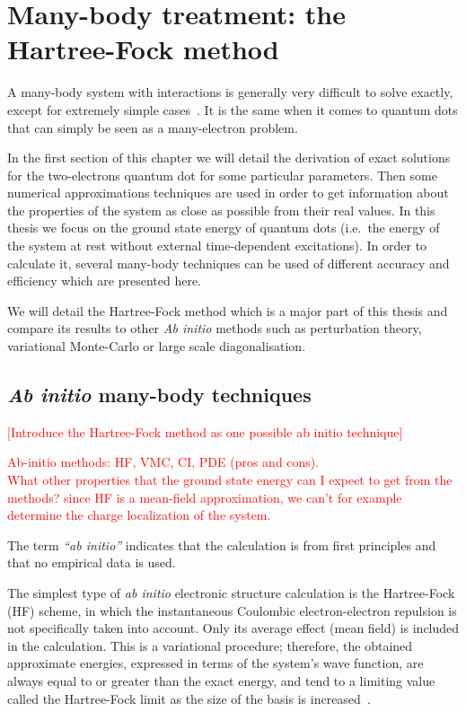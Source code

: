 \chapter{Many-body treatment: the Hartree-Fock method}
\label{HF}


A many-body system with interactions is generally very difficult to solve exactly, except for extremely simple cases~\cite{taut1993,taut1994}. It is the same when it comes to quantum dots that can simply be seen as a many-electron problem.

In the first section of this chapter we will detail the derivation of exact solutions for the two-electrons quantum dot for some particular parameters. Then some numerical approximations techniques are used in order to get information about the properties of the system as close as possible from their real values.
In this thesis we focus on the ground state energy of quantum dots (i.e.\ the energy of the system at rest without external time-dependent excitations). In order to calculate it, several many-body techniques can be used of different accuracy and efficiency which are presented here.

We will detail the Hartree-Fock method which is a major part of this thesis and compare its results to other \textit{Ab initio} methods such as perturbation theory, variational Monte-Carlo or large scale diagonalisation. 

\section{\textit{Ab initio} many-body techniques}
\textcolor{red}{[Introduce the Hartree-Fock method as one possible ab initio technique]}

\textcolor{red}{Ab-initio methods: HF, VMC, CI, PDE (pros and cons).\\ What other properties that the ground state energy can I expect to get from the methods? since HF is a mean-field approximation, we can't for example determine the charge localization of the system.}

The term \textit{``ab initio''} indicates that the calculation is from first principles and that no empirical data is used.

The simplest type of \textit{ab initio} electronic structure calculation is the Hartree-Fock (HF) scheme, in which the instantaneous Coulombic electron-electron repulsion is not specifically taken into account. Only its average effect (mean field) is included in the calculation. This is a variational procedure; therefore, the obtained approximate energies, expressed in terms of the system's wave function, are always equal to or greater than the exact energy, and tend to a limiting value called the Hartree-Fock limit as the size of the basis is increased~\cite{Cramer2004}.


